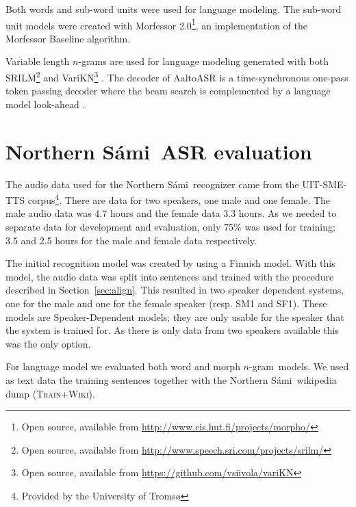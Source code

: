 \documentclass[b5paper]{article}
\newcommand{\ns}{Northern Sámi}
\newcommand{\ngram}{$n$-gram}
\newcommand{\ds}[1]{\textsc{#1}}
\begin{document}
Both words and sub-word units were used for language modeling. The sub-word unit models were created with Morfessor 2.0\footnote{Open source, available from \url{http://www.cis.hut.fi/projects/morpho/}}, an implementation of the Morfessor Baseline algorithm\cite{virpioja2013morfessor}. 

Variable length \ngram s are used for language modeling generated with both SRILM\footnote{Open source, available from \url{http://www.speech.sri.com/projects/srilm/}} \cite{stolcke2002srilm} and VariKN\footnote{Open source, available from \url{https://github.com/vsiivola/variKN}} \cite{siivola2007growing,siivola2007morfessor}. The decoder of AaltoASR is a time-synchronous one-pass token passing decoder where the beam search is complemented by a language model look-ahead \cite{ortmanns1997look}.




\section{\ns\ ASR evaluation} 
\label{sec:samiexp}
The audio data used for the \ns\ recognizer came from the UIT-SME-TTS corpus\footnote{Provided by the University of Tromsø}. There are data for two speakers, one male and one female. The male audio data was 4.7 hours and the female data 3.3 hours. As we needed to separate data for development and evaluation, only 75\% was used for training; 3.5 and 2.5 hours for the male and female data respectively.

The initial recognition model was created by using a Finnish model. With this model, the audio data was split into sentences and trained with the procedure described in Section~\ref{sec:align}. This resulted in two speaker dependent systems, one for the male and one for the female speaker (resp. SM1 and SF1). These models are Speaker-Dependent models; they are only usable for the speaker that the system is trained for. As there is only data from two speakers available this was the only option. 

For language model we evaluated both word and morph \ngram\ models. We used as text data the training sentences together with the \ns\ wikipedia dump (\ds{Train+Wiki}).
\end{document}
